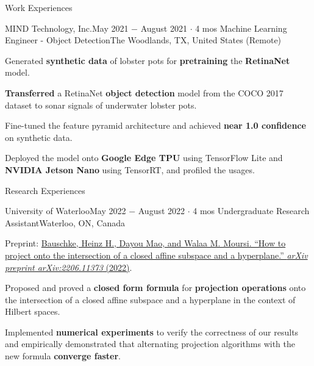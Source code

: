 \documentclass{resume}
\begin{document}
\begin{rSection}{Work Experiences}
    \begin{rSubsection}{MIND Technology, Inc.}{May 2021 \(-\) August 2021 \(\cdot\) 4 mos}
        {Machine Learning Engineer - Object Detection}{The Woodlands, TX, United States (Remote)}
        \item Generated \textbf{synthetic data} of lobster pots for \textbf{pretraining} the \textbf{RetinaNet} model.
        \item \textbf{Transferred} a RetinaNet \textbf{object detection} model
        from the COCO 2017 dataset to sonar signals of underwater lobster pots.
        \item Fine-tuned the feature pyramid architecture and achieved \textbf{near 1.0 confidence} on synthetic data.
        \item Deployed the model onto \textbf{Google Edge TPU} using TensorFlow Lite
        and \textbf{NVIDIA Jetson Nano} using TensorRT,
        and profiled the usages.
    \end{rSubsection}

\end{rSection}

\begin{rSection}{Research Experiences}

    \begin{rSubsection}{University of Waterloo}{May 2022 \(-\) August 2022 \(\cdot\) 4 mos}
        {Undergraduate Research Assistant}{Waterloo, ON, Canada}
        \item Preprint: \href{https://arxiv.org/abs/2206.11373}
        {Bauschke, Heinz H., Dayou Mao, and Walaa M. Moursi. ``How to project onto the intersection of a closed affine subspace and a hyperplane.'' \textit{arXiv preprint arXiv:2206.11373} (2022)}.
        \item Proposed and proved a \textbf{closed form formula} for \textbf{projection operations} onto the intersection of a closed affine subspace and a hyperplane in the context of Hilbert spaces.
        \item Implemented \textbf{numerical experiments} to verify the correctness of our results
        and empirically demonstrated that alternating projection algorithms with the new formula \textbf{converge faster}.
    \end{rSubsection}

\end{rSection}
\end{document}
